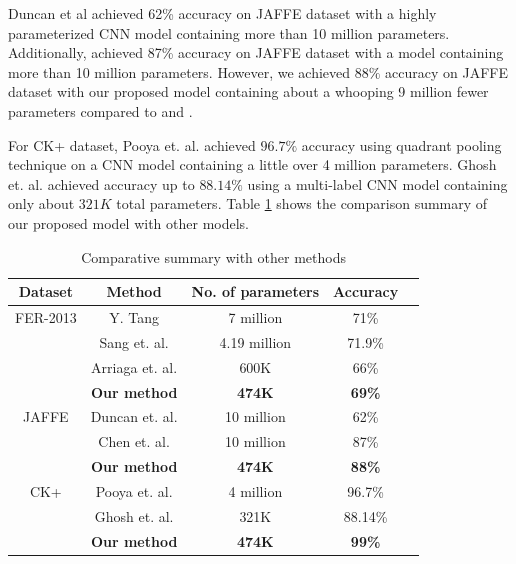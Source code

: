 \documentclass[master]{thesis-uestc}
\begin{document}
Duncan et al \cite{duncan2016} achieved 62\% accuracy on JAFFE dataset with a highly parameterized CNN model containing more than 10 million parameters. Additionally, \cite{7988558} achieved 87\% accuracy on JAFFE dataset with a model containing more than 10 million parameters. However, we achieved $88\%$ accuracy on JAFFE dataset with our proposed model containing about a whooping 9 million fewer parameters compared to \cite{duncan2016} and \cite{7988558}.

For CK+ dataset, Pooya et. al. \cite{do_deep_7406361} achieved $96.7\%$ accuracy using quadrant pooling technique on a CNN model containing a little over 4 million parameters. Ghosh et. al. \cite{Ghosh_7344632} achieved accuracy up to $88.14\%$ using a multi-label CNN model containing only about $321K$ total parameters. Table \ref{table_comparison} shows the comparison summary of our proposed model with other models. 

\begin{table}[ht]
\renewcommand{\arraystretch}{1.3}
\caption{Comparative summary with other methods}
\label{table_comparison}
\begin{center}
\begin{tabular}{|c|c|c|c|c|}
\hline
Dataset & Method & No. of parameters & Accuracy \\ \hline
FER-2013 & Y. Tang \cite{tang2018} & 7 million & 71\% \\
                 & Sang et. al. \cite{sang-2017} & 4.19 million & 71.9\% \\
	      & Arriaga et. al. \cite{DBLP:journals/corr/abs-1710-07557} & 600K & 66\% \\
	      & \textbf{Our method} & \textbf{474K} & \textbf{69\%} \\
\hline
JAFFE & Duncan et. al. \cite{duncan2016} & 10 million & 62\% \\
                 & Chen et. al. \cite{7988558} & 10 million & 87\% \\
	      & \textbf{Our method} & \textbf{474K} & \textbf{88\%} \\
\hline
CK+ & Pooya et. al. \cite{do_deep_7406361} & 4 million & 96.7\% \\
                 & Ghosh et. al. \cite{Ghosh_7344632} & 321K & 88.14\% \\
	      & \textbf{Our method} & \textbf{474K} & \textbf{99\%} \\
\hline
\end{tabular}
\end{center}
\end{table}
\end{document}
